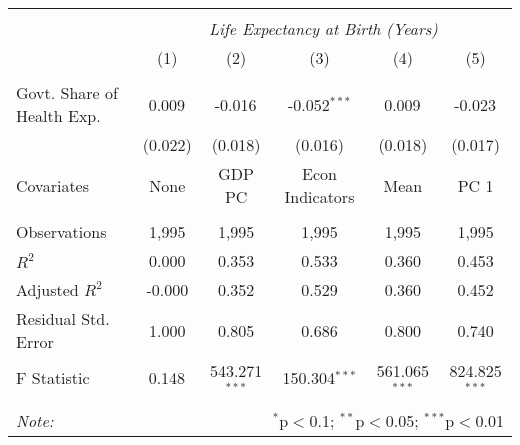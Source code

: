 \begin{table}[!htbp] \centering
\begin{tabular}{@{\extracolsep{5pt}}lccccc}
\\[-1.8ex]\hline
\hline \\[-1.8ex]
& \multicolumn{5}{c}{\textit{Life Expectancy at Birth (Years)}} \
\cr \
\\[-1.8ex] & (1) & (2) & (3) & (4) & (5) \\
\hline \\[-1.8ex]
 Govt. Share of Health Exp. & 0.009$^{}$ & -0.016$^{}$ & -0.052$^{***}$ & 0.009$^{}$ & -0.023$^{}$ \\
  & (0.022) & (0.018) & (0.016) & (0.018) & (0.017) \\
 Covariates & None & GDP PC & Econ Indicators & Mean & PC 1 \\
\hline \\[-1.8ex]
 Observations & 1,995 & 1,995 & 1,995 & 1,995 & 1,995 \\
 $R^2$ & 0.000 & 0.353 & 0.533 & 0.360 & 0.453 \\
 Adjusted $R^2$ & -0.000 & 0.352 & 0.529 & 0.360 & 0.452 \\
 Residual Std. Error & 1.000 & 0.805 & 0.686 & 0.800 & 0.740  \\
 F Statistic & 0.148$^{}$  & 543.271$^{***}$  & 150.304$^{***}$  & 561.065$^{***}$  & 824.825$^{***}$  \\
\hline
\hline \\[-1.8ex]
\textit{Note:} & \multicolumn{5}{r}{$^{*}$p$<$0.1; $^{**}$p$<$0.05; $^{***}$p$<$0.01} \\
\end{tabular}
\end{table}